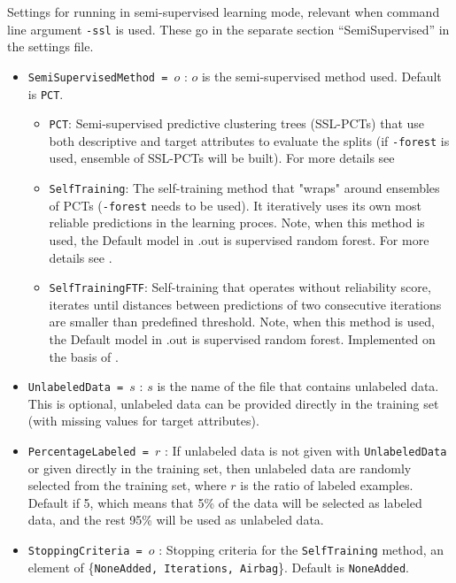 Settings for running \clus{} in semi-supervised learning mode, relevant when command line argument {\tt -ssl} is used. These go in the separate section ``SemiSupervised'' in the settings file.

\begin{itemize}
	\item {\tt SemiSupervisedMethod = $o$} : $o$ is the semi-supervised method used. Default is {\tt PCT}.
	\begin{itemize}
		\item {\tt PCT}: Semi-supervised predictive clustering trees (SSL-PCTs) that use both descriptive and target attributes to evaluate the splits (if {\tt -forest} is used, ensemble of SSL-PCTs will be built). For more details see \cite{levatic2017_SSL4MTR_distanceBased,levatic2017_SSL4class_distanceBased}
		\item {\tt SelfTraining}: The self-training method that "wraps" around ensembles of PCTs ({\tt -forest} needs to be used). It iteratively uses its own most reliable predictions in the learning proces. Note, when this method is used, the Default model in .out is supervised random forest. For more details see \cite{levatic2017_self-training}.  
		\item {\tt SelfTrainingFTF}: Self-training that operates without reliability score, iterates until distances between predictions of two consecutive iterations are smaller than predefined threshold. Note, when this method is used, the Default model in .out is supervised random forest. Implemented on the basis of \cite{culp_iterative_2008}.
	\end{itemize}
	\item {\tt UnlabeledData = $s$} : $s$ is the name of the file that contains unlabeled data. This is optional, unlabeled data can be provided directly in the training set (with missing values for target attributes).
	\item {\tt PercentageLabeled = $r$} : If unlabeled data is not given with {\tt UnlabeledData} or given directly in the training set, then unlabeled data are randomly selected from the training set, where $r$ is the ratio of labeled examples. Default if 5, which means that 5\% of the data will be selected as labeled data, and the rest 95\% will be used as unlabeled data. 
	\item {\tt StoppingCriteria = $o$} : Stopping criteria for the {\tt SelfTraining} method, an element of \{{\tt NoneAdded, Iterations, Airbag}\}. Default is {\tt NoneAdded}.
	\begin{itemize}

\end{itemize}
\end{itemize}
